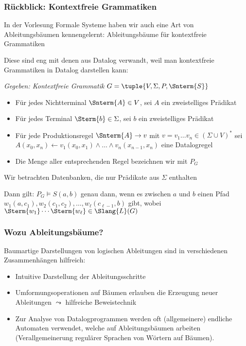\documentclass[aspectratio=1610,onlymath]{beamer}
\begin{document}
\begin{frame}\frametitle{Rückblick: Kontextfreie Grammatiken}

In der Vorlesung Formale Systeme haben wir auch eine Art von Ableitungsbäumen kennengelernt:
\alert{Ableitungsbäume für kontextfreie Grammatiken}\bigskip\pause

Diese sind eng mit denen aus Datalog verwandt, weil man kontextfreie Grammatiken in Datalog darstellen kann:\medskip

\emph{Gegeben: Kontextfreie Grammatik} $G=\tuple{V,\Sigma,P,\Snterm{S}}$
\begin{itemize}
\item Für jedes Nichtterminal $\Snterm{A}\in V$, sei $A$ ein zweistelliges Prädikat
\item Für jedes Terminal $\Sterm{b}\in \Sigma$, sei $b$ ein zweistelliges Prädikat
\item Für jede Produktionsregel $\Snterm{A}\to v$ mit $v=v_1\ldots v_n\in(\Sigma\cup V)^*$ sei $A(x_0,x_n)\leftarrow v_1(x_0,x_1)\wedge\ldots\wedge v_n(x_{n-1},x_n)$ eine Datalogregel
\item Die Menge aller entsprechenden Regel bezeichnen wir mit $P_G$
\end{itemize}
Wir betrachten Datenbanken, die nur Prädikate aus $\Sigma$ enthalten\bigskip\pause

Dann gilt: $P_G\models S(a,b)$ genau dann, wenn es zwischen $a$ und $b$ einen
Pfad $w_1(a,c_1),w_2(c_1,c_2),\ldots,w_\ell(c_{\ell-1},b)$ gibt, wobei $\Sterm{w_1}\cdots \Sterm{w_\ell}\in\Slang{L}(G)$


\end{frame}

\begin{frame}\frametitle{Wozu Ableitungsbäume?}

Baumartige Darstellungen von logischen Ableitungen sind in verschiedenen Zusammenhängen hilfreich:
\begin{itemize}
\item Intuitive Darstellung der Ableitungsschritte
\item Umformungsoperationen auf Bäumen erlauben die Erzeugung neuer Ableitungen $\leadsto$ hilfreiche Beweistechnik
\item Zur Analyse von Datalogprogrammen werden oft (allgemeinere) endliche Automaten verwendet, welche auf Ableitungsbäumen arbeiten (Verallgemeinerung regulärer Sprachen von Wörtern auf Bäumen).
\end{itemize}

\end{frame}
\end{document}
